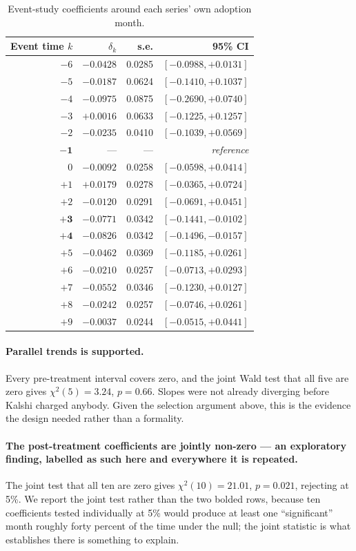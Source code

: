 \documentclass[preprint,12pt,authoryear]{elsarticle}
\begin{document}
\begin{table}[htbp]
\centering
\caption{Event-study coefficients around each series' own adoption month.}
\begin{tabular}{rrrr}
\toprule
Event time $k$ & $\delta_k$ & s.e. & 95\% CI \\
\midrule
$-6$ & $-0.0428$ & 0.0285 & $[-0.0988, +0.0131]$ \\
$-5$ & $-0.0187$ & 0.0624 & $[-0.1410, +0.1037]$ \\
$-4$ & $-0.0975$ & 0.0875 & $[-0.2690, +0.0740]$ \\
$-3$ & $+0.0016$ & 0.0633 & $[-0.1225, +0.1257]$ \\
$-2$ & $-0.0235$ & 0.0410 & $[-0.1039, +0.0569]$ \\
$\mathbf{-1}$ & --- & --- & \emph{reference} \\
0    & $-0.0092$ & 0.0258 & $[-0.0598, +0.0414]$ \\
$+1$ & $+0.0179$ & 0.0278 & $[-0.0365, +0.0724]$ \\
$+2$ & $-0.0120$ & 0.0291 & $[-0.0691, +0.0451]$ \\
$\mathbf{+3}$ & $\mathbf{-0.0771}$ & 0.0342 & $\mathbf{[-0.1441, -0.0102]}$ \\
$\mathbf{+4}$ & $\mathbf{-0.0826}$ & 0.0342 & $\mathbf{[-0.1496, -0.0157]}$ \\
$+5$ & $-0.0462$ & 0.0369 & $[-0.1185, +0.0261]$ \\
$+6$ & $-0.0210$ & 0.0257 & $[-0.0713, +0.0293]$ \\
$+7$ & $-0.0552$ & 0.0346 & $[-0.1230, +0.0127]$ \\
$+8$ & $-0.0242$ & 0.0257 & $[-0.0746, +0.0261]$ \\
$+9$ & $-0.0037$ & 0.0244 & $[-0.0515, +0.0441]$ \\
\bottomrule
\end{tabular}
\end{table}

\paragraph{Parallel trends is supported.} Every pre-treatment interval covers
zero, and the joint Wald test that all five are zero gives $\chi^2(5) = 3.24$,
$p = 0.66$. Slopes were not already diverging before Kalshi charged anybody.
Given the selection argument above, this is the evidence the design needed
rather than a formality.

\paragraph{The post-treatment coefficients are jointly non-zero --- an
exploratory finding, labelled as such here and everywhere it is repeated.} The
joint test that all ten are zero gives $\chi^2(10) = 21.01$, $p = 0.021$,
rejecting at 5\%. We report the joint test rather than the two bolded rows,
because ten coefficients tested individually at 5\% would produce at least one
``significant'' month roughly forty percent of the time under the null; the
joint statistic is what establishes there is something to explain.
\end{document}
